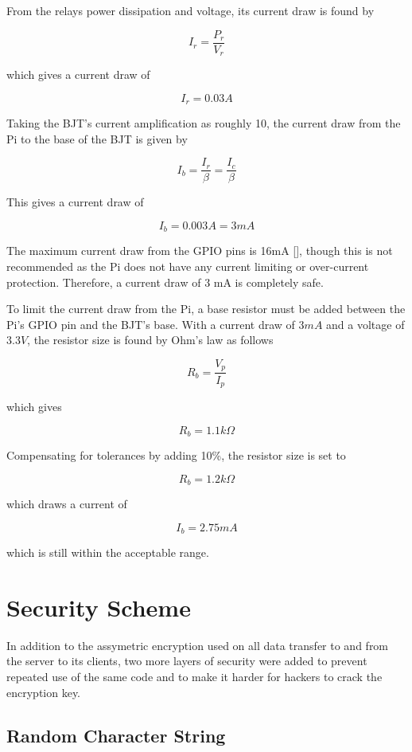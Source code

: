 From the relays power dissipation and voltage, its current draw is found by

\[
I_{r} = \frac{P_{r}}{V_{r}}
\]

which gives a current draw of

\[
I_{r} = 0.03A
\]

Taking the BJT's current amplification as roughly 10, the current draw from the Pi to the
base of the BJT is given by

\[
I_{b} = \frac{I_{r}}{\beta} = \frac{I_{c}}{\beta}
\]

This gives a current draw of

\[
I_{b} = 0.003A = 3mA
\]

The maximum current draw from the GPIO pins is 16mA [\cite{website:gpio-specs}], though this is
not recommended as the Pi does not have any current limiting or over-current protection.
Therefore, a current draw of 3 mA is completely safe.

To limit the current draw from the Pi, a base resistor must be added between the Pi's GPIO pin
and the BJT's base. With a current draw of $3mA$ and a voltage of $3.3V$, the resistor size is
found by Ohm's law as follows

\[
R_{b} = \frac{V_{p}}{I_{p}}
\]

which gives

\[
R_{b} = 1.1k\Omega
\]

Compensating for tolerances by adding 10\%, the resistor size is set to

\[R_{b} = 1.2k\Omega\]

which draws a current of 

\[I_{b} = 2.75 mA \]

which is still within the acceptable range.

\section{Security Scheme}
\label{sec:security-code-scheme}

In addition to the assymetric encryption used on all data transfer to and from
the server to its clients, two more layers of security were added to prevent
repeated use of the same code and to make it harder for hackers to crack the
encryption key.

\subsection{Random Character String}

